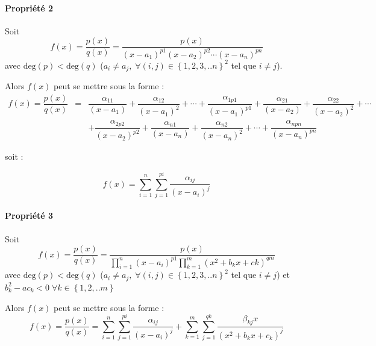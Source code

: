 \documentclass[11pt,oneside]{article}
\begin{document}
\paragraph*{Propriété 2}
\begin{prop}
Soit
$$
f(x)=\dfrac{p(x)}{q(x)}=
\dfrac{p(x)}{\left(x-a_1 \right)^{p1}\left(x-a_2 \right)^{p2}\cdots\left(x-a_n
\right)^{pn}}
$$
avec $\text{deg}(p)<\text{deg}(q)$ ($a_i\neq a_j,\; \forall (i,j) \in \left\{1,2,3,..n
\right\}^2$ tel que $i\neq j$).

Alors $f(x)$ peut se mettre sous la forme :
$$
\begin{array}{lll}
f(x)=\dfrac{p(x)}{q(x)}&=&
\dfrac{\alpha_{11}}{\left(x-a_1 \right)}
+\dfrac{\alpha_{12}}{\left(x-a_1 \right)^2}
+\cdots
+\dfrac{\alpha_{1p1}}{\left(x-a_1 \right)^{p1}}
+\dfrac{\alpha_{21}}{\left(x-a_2 \right)}
+\dfrac{\alpha_{22}}{\left(x-a_2 \right)^{2}}
+\cdots \\
&&
+\dfrac{\alpha_{2p2}}{\left(x-a_2 \right)^{p2}}
+\dfrac{\alpha_{n1}}{\left(x-a_n \right)}
+\dfrac{\alpha_{n2}}{\left(x-a_n \right)^{2}}
+\cdots
+\dfrac{\alpha_{npn}}{\left(x-a_n \right)^{pn}}
\end{array}
$$

soit : 

$$
f(x)=\sum\limits_{i=1}^n \sum\limits_{j=1}^{pi}
\dfrac{\alpha_{ij}}{\left(x-a_i\right)^j}
$$
\end{prop}
\paragraph*{Propriété 3}
\begin{prop}
Soit
$$
f(x)=\dfrac{p(x)}{q(x)}=
\dfrac{p(x)}{
\prod\limits_{i=1}^{n} \left(x-a_i \right)^{p1}
\prod\limits_{k=1}^{m} \left(x^2+b_kx+ck \right)^{qm}
}
$$
avec $\text{deg}(p)<\text{deg}(q)$ ($a_i\neq a_j,\; \forall (i,j) \in \left\{1,2,3,..n
\right\}^2$ tel que $i\neq j$) et $b^2_k-ac_k<0 \; \forall k \in\left\{1,2,..m
\right\}$ 

Alors $f(x)$ peut se mettre sous la forme :
$$
f(x)=\dfrac{p(x)}{q(x)}=
\sum\limits_{i=1}^n \sum\limits_{j=1}^{pi}
\dfrac{\alpha_{ij}}{\left(x-a_i\right)^j}
+
\sum\limits_{k=1}^m \sum\limits_{j=1}^{qk}
\dfrac{\beta_{kj}x}{\left(x^2+b_kx+c_k\right)^j}
$$
\end{prop}
\end{document}
